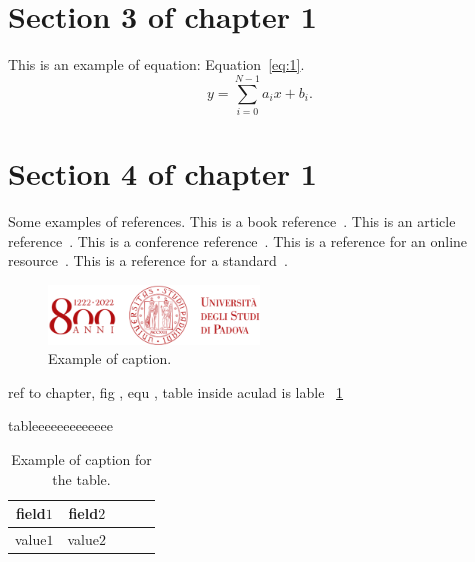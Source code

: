 \section{Section 3 of chapter 1}\label{sect:1_3} 
This is an example of equation: Equation~\ref{eq:1}.
\begin{equation}
\label{eq:1}
    y = \sum_{i=0}^{N-1}a_ix + b_i.
\end{equation}

\section{Section 4 of chapter 1}\label{sect:1_4} 
Some examples of references. 
This is a book reference~\cite{book1}.  
This is an article reference~\cite{article1}.  
This is a conference reference~\cite{conference1}.  
This is a reference for an online resource~\cite{online1}.  
This is a reference for a standard~\cite{standard1}.  

\begin{figure}[h!]
\centering
\includegraphics[width=0.5\textwidth]{figures/example.png}
\caption[Example of caption.]{Example of caption.\label{fig:1}}
\end{figure}


ref to chapter, fig , equ , table 
inside aculad is lable ~\ref{fig:1} 

tableeeeeeeeeeeee
\begin{table}[h]
\centering
\begin{tabular}{c|c|c|c|c}
\toprule
field$1$ & field$2$ \\ \midrule
value$1$ & value$2$ \\
\bottomrule
\end{tabular}
\caption[Example of caption for the table.]{Example of caption for the table.}
\label{tab:1}
\end{table}